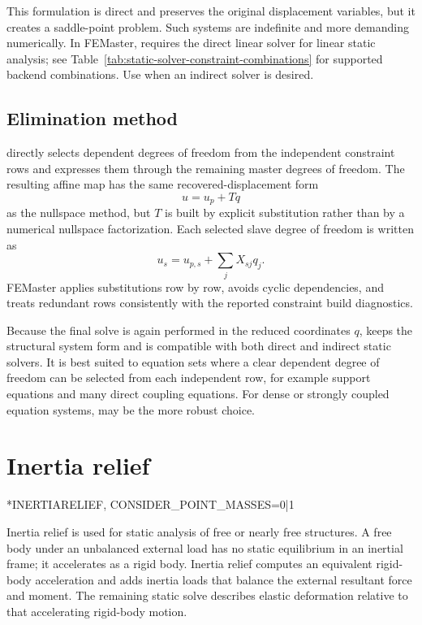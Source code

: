 This formulation is direct and preserves the original displacement variables, but it creates a saddle-point problem. Such systems are indefinite and more demanding numerically. In FEMaster,  requires the direct linear solver for linear static analysis; see Table~\ref{tab:static-solver-constraint-combinations} for supported backend combinations. Use  when an indirect solver is desired.

\subsection{Elimination method}

 directly selects dependent degrees of freedom from the independent constraint rows and expresses them through the remaining master degrees of freedom. The resulting affine map has the same recovered-displacement form
\[
u = u_p + T q
\]
as the nullspace method, but \(T\) is built by explicit substitution rather than by a numerical nullspace factorization. Each selected slave degree of freedom is written as
\[
u_s = u_{p,s} + \sum_j X_{sj} q_j .
\]
FEMaster applies substitutions row by row, avoids cyclic dependencies, and treats redundant rows consistently with the reported constraint build diagnostics.

Because the final solve is again performed in the reduced coordinates \(q\),  keeps the structural system form and is compatible with both direct and indirect static solvers. It is best suited to equation sets where a clear dependent degree of freedom can be selected from each independent row, for example support equations and many direct coupling equations. For dense or strongly coupled equation systems,  may be the more robust choice.

\section{Inertia relief}

\begin{syntax}
*INERTIARELIEF, CONSIDER_POINT_MASSES=0|1
\end{syntax}

Inertia relief is used for static analysis of free or nearly free structures. A free body under an unbalanced external load has no static equilibrium in an inertial frame; it accelerates as a rigid body. Inertia relief computes an equivalent rigid-body acceleration and adds inertia loads that balance the external resultant force and moment. The remaining static solve describes elastic deformation relative to that accelerating rigid-body motion.

